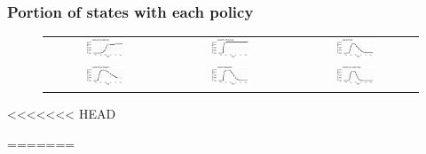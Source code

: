\documentclass{beamer}
\begin{document}
\begin{frame}
  \frametitle{Portion of states with each
    policy}\vspace{-0.05cm}

\begin{figure}[ht]%
  \begin{minipage}{\linewidth}
    \begin{tabular}{ccc}
      \includegraphics[width=0.33\textwidth]{../tables_and_figures/pmaskbus_p}
      &
        \includegraphics[width=0.33\textwidth]{../tables_and_figures/pk12_p}
      &
        \includegraphics[width=0.33\textwidth]{../tables_and_figures/pshelter_p}
      \\
      \includegraphics[width=0.33\textwidth]{../tables_and_figures/pmovie_p}
      &
        \includegraphics[width=0.33\textwidth]{../tables_and_figures/prestaurant_p}
      &
        \includegraphics[width=0.33\textwidth]{../tables_and_figures/pnonessential_p}
    \end{tabular}
  \end{minipage}
\end{figure}


<<<<<<< HEAD
   
=======

\end{frame}
\end{document}
